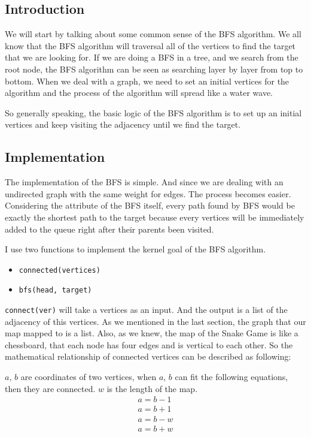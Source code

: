 \documentclass[12pt]{article}
\begin{document}
\subsection{Introduction}
We will start by talking about some common sense of the BFS algorithm. We all know that the BFS algorithm will traversal all of the vertices to find the target that we are looking for. If we are doing a BFS in a tree, and we search from the root node, the BFS algorithm can be seen as searching layer by layer from top to bottom. When we deal with a graph, we need to set an initial vertices for the algorithm and the process of the algorithm will spread like a water wave.

So generally speaking, the basic logic of the BFS algorithm is to set up an initial vertices and keep visiting the adjacency until we find the target. 

\subsection{Implementation}
The implementation of the BFS is simple. And since we are dealing with an undirected graph with the same weight for edges. The process becomes easier. Considering the attribute of the BFS itself, every path found by BFS would be exactly the shortest path to the target because every vertices will be immediately added to the queue right after their parents been visited.

I use two functions to implement the kernel goal of the BFS algorithm. 
\begin{itemize}
    \item \verb|connected(vertices)|
    \item \verb|bfs(head, target)|
\end{itemize}

\verb|connect(ver)| will take a vertices as an input. And the output is a list of the adjacency of this vertices. As we mentioned in the last section, the graph that our map mapped to is a list. Also, as we knew, the map of the Snake Game is like a chessboard, that each node has four edges and is vertical to each other. So the mathematical relationship of connected vertices can be described as following:

$a$, $b$ are coordinates of two vertices, when $a$, $b$ can fit the following equations, then they
are connected. $w$ is the length of the map.
\begin{eqnarray}
        a = b - 1 \\
        a = b + 1 \\
        a = b - w \\
        a = b + w 
\end{eqnarray}
\end{document}
